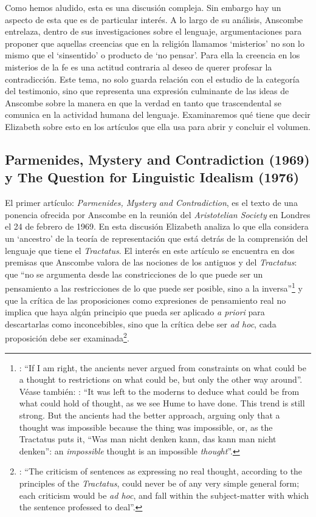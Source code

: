 Como hemos aludido, esta es una discusión compleja. Sin embargo hay un aspecto de esta que es de particular interés. A lo largo de su análisis, Anscombe entrelaza, dentro de sus investigaciones sobre el lenguaje, argumentaciones para proponer que aquellas creencias que en la religión llamamos `misterios' no son lo mismo que el `sinsentido' o producto de `no pensar'. Para ella la creencia en los misterios de la fe es una actitud contraria al deseo de querer profesar la contradicción. Este tema, no solo guarda relación con el estudio de la categoría del testimonio, sino que representa una expresión culminante de las ideas de Anscombe sobre la manera en que la verdad en tanto que trascendental se comunica en la actividad humana del lenguaje. Examinaremos qué tiene que decir Elizabeth sobre esto en los artículos que ella usa para abrir y concluir el volumen.

\subsection{Parmenides, Mystery and Contradiction (1969) y The Question for Linguistic Idealism (1976)}
El primer artículo: \emph{Parmenides, Mystery and Contradiction}, es el texto de una ponencia ofrecida por Anscombe en la reunión del \emph{Aristotelian Society} en Londres el 24 de febrero de 1969. En esta discusión Elizabeth analiza lo que ella considera un `ancestro' de la teoría de representación que está detrás de la comprensión del lenguaje que tiene el \emph{Tractatus}. El interés en este artículo se encuentra en dos premisas que Anscombe valora de las nociones de los antiguos y del \emph{Tractatus}: que \enquote{no se argumenta desde las constricciones de lo que puede ser un pensamiento a las restricciones de lo que puede ser posible, sino a la inversa}\footnote{\Cite[Cf.][Introduction, viii]{anscombe1981parmenides}: \enquote{If I am right, the ancients never argued from constraints on what could be a thought to restrictions on what could be, but only the other way around}. Véase también: \cite[Introduction, xi]{anscombe1981parmenides}: \enquote{It was left to the moderns to deduce what could be from what could hold of thought, as we see Hume to have done. This trend is still strong. But the ancients had the better approach, arguing only that a thought was impossible because the thing was impossible, or, as the Tractatus puts it, ``Was man nicht denken kann, das kann man nicht denken'': an \emph{impossible} thought is an impossible \emph{thought}}.} y que la crítica de las proposiciones como expresiones de pensamiento real no implica que haya algún principio que pueda ser aplicado \emph{a priori} para descartarlas como inconcebibles, sino que la crítica debe ser \emph{ad hoc}, cada proposición debe ser examinada\footnote{\Cite[Cf.][151]{anscombe1959iwt}: \enquote{The criticism of sentences as expressing no real thought, according to the principles of the \emph{Tractatus}, could never be of any very simple general form; each criticism would be \emph{ad hoc}, and fall within the subject-matter with which the sentence professed to deal}.}.

